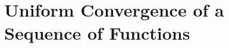 
\setcounter{section}{1}
\section{Uniform Convergence of a Sequence of Functions}
\setcounter{exercise}{0}
